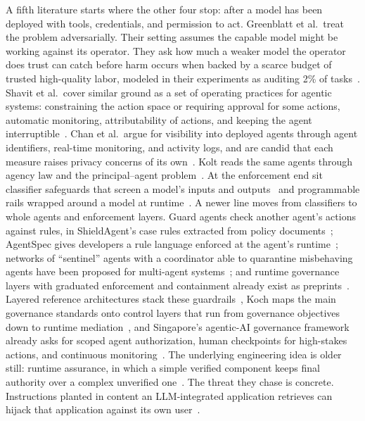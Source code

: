 \documentclass[journal]{IEEEtran}
\begin{document}
A fifth literature starts where the other four stop: after a model has been deployed with tools, credentials, and permission to act. Greenblatt et al.\ treat the problem adversarially. Their setting assumes the capable model might be working against its operator. They ask how much a weaker model the operator does trust can catch before harm occurs when backed by a scarce budget of trusted high-quality labor, modeled in their experiments as auditing 2\% of tasks~\cite{greenblatt2024aicontrol}.
Shavit et al.\ cover similar ground as a set of operating practices for agentic systems: constraining the action space or requiring approval for some actions, automatic monitoring, attributability of actions, and keeping the agent interruptible~\cite{shavit2023agentic}.
Chan et al.\ argue for visibility into deployed agents through agent identifiers, real-time monitoring, and activity logs, and are candid that each measure raises privacy concerns of its own~\cite{chan2024visibility}.
Kolt reads the same agents through agency law and the principal--agent problem~\cite{kolt2025agents}.
At the enforcement end sit classifier safeguards that screen a model's inputs and outputs~\cite{inan2023llamaguard,sharma2025constitutionalclassifiers}
and programmable rails wrapped around a model at runtime~\cite{rebedea2023nemo}.
A newer line moves from classifiers to whole agents and enforcement layers. Guard agents check another agent's actions against rules, in ShieldAgent's case rules extracted from policy documents~\cite{xiang2025guardagent,chen2025shieldagent};
AgentSpec gives developers a rule language enforced at the agent's runtime~\cite{wang2026agentspec};
networks of ``sentinel'' agents with a coordinator able to quarantine misbehaving agents have been proposed for multi-agent systems~\cite{gosmar2025sentinel};
and runtime governance layers with graduated enforcement and containment already exist as preprints~\cite{gaurav2025gaas,wang2025mi9}.
Layered reference architectures stack these guardrails~\cite{shamsujjoha2025swiss},
Koch maps the main governance standards onto control layers that run from governance objectives down to runtime mediation~\cite{koch2026layered},
and Singapore's agentic-AI governance framework already asks for scoped agent authorization, human checkpoints for high-stakes actions, and continuous monitoring~\cite{imda2026agentic}.
The underlying engineering idea is older still: runtime assurance, in which a simple verified component keeps final authority over a complex unverified one~\cite{sha2001simplex,alshiekh2018shielding}.
The threat they chase is concrete. Instructions planted in content an LLM-integrated application retrieves can hijack that application against its own user~\cite{greshake2023injection}.
\end{document}
